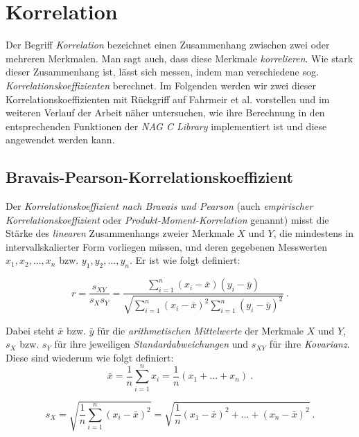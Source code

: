 \section{Korrelation}

Der Begriff {\it Korrelation} bezeichnet einen Zusammenhang zwischen zwei oder mehreren Merkmalen. Man sagt auch, dass diese Merkmale {\it korrelieren}. Wie stark dieser Zusammenhang ist, lässt sich messen, indem man verschiedene sog. {\it Korrelationskoeffizienten} berechnet. Im Folgenden werden wir zwei dieser Korrelationskoeffizienten mit Rückgriff auf Fahrmeir et al. \cite{Fahrmeir2010} vorstellen und im weiteren Verlauf der Arbeit näher untersuchen, wie ihre Berechnung in den entsprechenden Funktionen der {\it NAG C Library} implementiert ist und diese angewendet werden kann.

\subsection{Bravais-Pearson-Korrelationskoeffizient}
\label{sec:corr_per}

Der {\it Korrelationskoeffizient nach Bravais und Pearson} (auch {\it empirischer Korrelationskoeffizient} oder {\it Produkt-Moment-Korrelation} genannt) misst die Stärke des {\it linearen} Zusammenhangs zweier Merkmale $X$ und $Y$, die mindestens in intervallskalierter Form vorliegen müssen, und deren gegebenen Messwerten $x_1,x_2,...,x_n$ bzw. $y_1,y_2,...,y_n$. Er ist wie folgt definiert:

\begin{equation*}
	r=\dfrac{s_{XY}}{s_Xs_Y}=\dfrac{\sum_{i=1}^{n}{(x_i-\bar{x})(y_i-\bar{y})}}{\sqrt{\sum_{i=1}^{n}{(x_i-\bar{x})^2\sum_{i=1}^{n}{(y_i-\bar{y})^2}}}} ~.
\end{equation*}

\noindent Dabei steht $\bar{x}$ bzw. $\bar{y}$ für die {\it arithmetischen Mittelwerte} der Merkmale $X$ und $Y$, $s_{X}$ bzw. $s_{Y}$ für ihre jeweiligen {\it Standardabweichungen} und $s_{XY}$ für ihre {\it Kovarianz}. Diese sind wiederum wie folgt definiert:\\

\begin{equation*}
	\bar{x}=\dfrac{1}{n}\sum_{i=1}^{n}{x_i}=\dfrac{1}{n}(x_1+...+x_n) ~.
\end{equation*}

\begin{equation*}
	s_X=\sqrt{\dfrac{1}{n}\sum_{i=1}^{n}{(x_i-\bar{x})^2}}=\sqrt{\dfrac{1}{n}(x_1-\bar{x})^2+...+(x_n-\bar{x})^2} ~.
\end{equation*}

